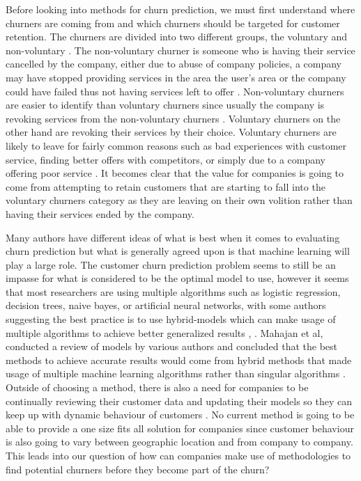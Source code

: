 \documentclass[12pt, a4paper]{article}
\begin{document}
 Before looking into methods for churn prediction, we must first understand where churners are coming from and which churners should be targeted for customer retention. The churners are divided into two different groups, the voluntary and non-voluntary \cite{churn_mobile_industry}. The non-voluntary churner is someone who is having their service cancelled by the company, either due to abuse of company policies, a company may have stopped providing services in the area the user's area or the company could have failed thus not having services left to offer \cite{hadden2007computer}. Non-voluntary churners are easier to identify than voluntary churners since usually the company is revoking services from the non-voluntary churners \cite{hadden2007computer}. Voluntary churners on the other hand are revoking their services by their choice. Voluntary churners are likely to leave for fairly common reasons such as bad experiences with customer service, finding better offers with competitors, or simply due to a company offering poor service \cite{customer_loyalty}. It becomes clear that the value for companies is going to come from attempting to retain customers that are starting to fall into the voluntary churners category as they are leaving on their own volition rather than having their services ended by the company.

Many authors have different ideas of what is best when it comes to evaluating churn prediction but what is generally agreed upon is that machine learning will play a large role. The customer churn prediction problem seems to still be an impasse for what is considered to be the optimal model to use, however it seems that most researchers are using multiple algorithms such as logistic regression, decision trees, naive bayes, or artificial neural networks, with some authors suggesting the best practice is to use hybrid-models which can make usage of multiple algorithms to achieve better generalized results \cite{HUANG20121414}, \cite{hybrid_approach}. Mahajan et al, conducted a review of models by various authors and concluded that the best methods to achieve accurate results would come from hybrid methods that made usage of multiple machine learning algorithms rather than singular algorithms \cite{mahajan2017review}. Outside of choosing a method, there is also a need for companies to be continually reviewing their customer data and updating their models so they can keep up with dynamic behaviour of customers \cite{WEI2002103}. No current method is going to be able to provide a one size fits all solution for companies since customer behaviour is also going to vary between geographic location and from company to company. This leads into our question of how can companies make use of methodologies to find potential churners before they become part of the churn?
\end{document}
